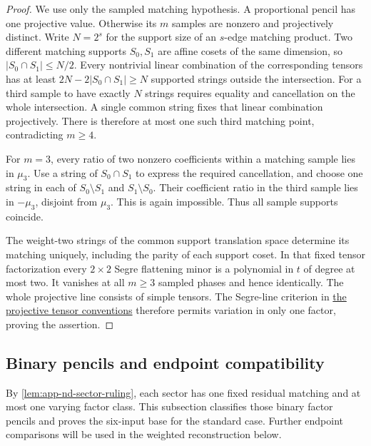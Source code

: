 \documentclass[11pt,letterpaper,onecolumn]{article}
\theoremstyle{plain}
\theoremstyle{definition}
\theoremstyle{remark}
\begin{document}
\begin{proof}
We use only the sampled matching hypothesis.  A proportional pencil has
one projective value.  Otherwise
its \(m\) samples are nonzero and projectively distinct.  Write
\(N=2^s\) for the support size of an \(s\)-edge matching product.
Two different matching supports \(S_0,S_1\) are affine cosets of the
same dimension, so \(|S_0\cap S_1|\le N/2\).  Every nontrivial linear
combination of the corresponding tensors has at least
\(2N-2|S_0\cap S_1|\ge N\) supported strings outside the intersection.
For a third sample to have exactly \(N\) strings requires equality and
cancellation on the whole intersection.  A single common string fixes that
linear combination projectively.  There is therefore at most one such
third matching point, contradicting \(m\ge4\).

For \(m=3\), every ratio of two nonzero coefficients within a matching
sample lies in \(\mu_3\).  Use a string of \(S_0\cap S_1\) to express
the required cancellation, and choose one string in each of
\(S_0\setminus S_1\) and \(S_1\setminus S_0\).  Their coefficient
ratio in the third sample lies in \(-\mu_3\), disjoint from \(\mu_3\).
This is again impossible.  Thus all sample supports coincide.

The weight-two strings of the common support translation space determine its
matching uniquely, including the parity of each support coset.  In that
fixed tensor factorization every \(2\times2\) Segre flattening
minor is a polynomial in \(t\) of degree at most two.  It vanishes at
all \(m\ge3\) sampled phases and hence identically.  The whole
projective line consists of simple tensors.  The Segre-line criterion
in \hyperref[subsubsec:projective-tensor-geometry]{the projective tensor conventions} therefore permits variation
in only one factor, proving the assertion.
\end{proof}

\subsection{Binary pencils and endpoint compatibility}
\label{proofsubsec:nd-endpoints}

By \cref{lem:app-nd-sector-ruling}, each sector has one
fixed residual matching and at most one varying factor class.  This
subsection classifies those binary factor pencils and proves the
six-input base for the standard case. Further endpoint comparisons
will be used in the weighted reconstruction below.
\end{document}
